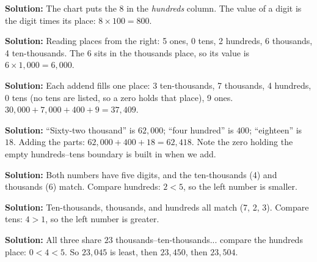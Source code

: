 \documentclass[12pt]{article}
\begin{document}



\textbf{Solution:} The chart puts the 8 in the \emph{hundreds} column. The value
of a digit is the digit times its place: $8 \times 100 = 800$. 


\textbf{Solution:} Reading places from the right: 5 ones, 0 tens, 2 hundreds,
6 thousands, 4 ten-thousands. The 6 sits in the thousands place, so its value is
$6 \times 1{,}000 = 6{,}000$. 


\textbf{Solution:} Each addend fills one place: 3 ten-thousands, 7 thousands,
4 hundreds, 0 tens (no tens are listed, so a zero holds that place), 9 ones.
$30{,}000 + 7{,}000 + 400 + 9 = 37{,}409$. 


\textbf{Solution:} ``Sixty-two thousand'' is $62{,}000$; ``four hundred'' is
$400$; ``eighteen'' is $18$. Adding the parts: $62{,}000 + 400 + 18 = 62{,}418$.
Note the zero holding the empty hundreds--tens boundary is built in when we add.


\textbf{Solution:} Both numbers have five digits, and the ten-thousands (4) and
thousands (6) match. Compare hundreds: $2 < 5$, so the left number is smaller.


\textbf{Solution:} Ten-thousands, thousands, and hundreds all match (7, 2, 3).
Compare tens: $4 > 1$, so the left number is greater. 


\textbf{Solution:} All three share $23$ thousands--ten-thousands... compare the
hundreds place: $0 < 4 < 5$. So $23{,}045$ is least, then $23{,}450$, then
$23{,}504$. 
\end{document}
